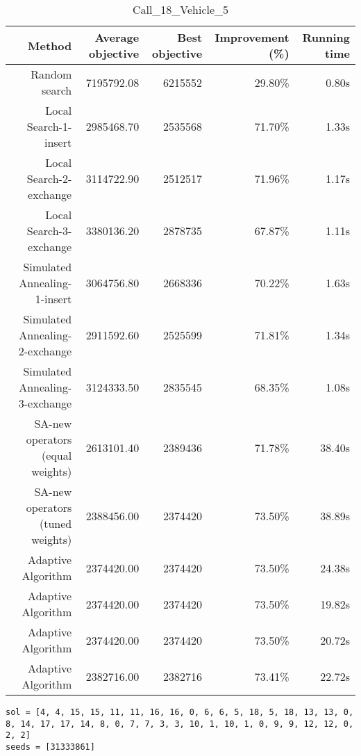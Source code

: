 \begin{table}[ht]
\centering
\caption{Call\_18\_Vehicle\_5}
\label{tab:call18vehicle5}
\begin{tabular}{|r|r|r|r|r|}
Method & Average objective & Best objective & Improvement (\%) & Running time \\
\hline
Random search & 7195792.08 & 6215552 & 29.80\% & 0.80s\\
Local Search-1-insert & 2985468.70 & 2535568 & 71.70\% & 1.33s\\
Local Search-2-exchange & 3114722.90 & 2512517 & 71.96\% & 1.17s\\
Local Search-3-exchange & 3380136.20 & 2878735 & 67.87\% & 1.11s\\
Simulated Annealing-1-insert & 3064756.80 & 2668336 & 70.22\% & 1.63s\\
Simulated Annealing-2-exchange & 2911592.60 & 2525599 & 71.81\% & 1.34s\\
Simulated Annealing-3-exchange & 3124333.50 & 2835545 & 68.35\% & 1.08s\\
SA-new operators (equal weights) & 2613101.40 & 2389436 & 71.78\% & 38.40s\\
SA-new operators (tuned weights) & 2388456.00 & 2374420 & 73.50\% & 38.89s\\
Adaptive Algorithm & 2374420.00 & 2374420 & 73.50\% & 24.38s\\
Adaptive Algorithm & 2374420.00 & 2374420 & 73.50\% & 19.82s\\
Adaptive Algorithm & 2374420.00 & 2374420 & 73.50\% & 20.72s\\
Adaptive Algorithm & 2382716.00 & 2382716 & 73.41\% & 22.72s\\
\end{tabular}%
\end{table}
\begin{lstlisting}[label={lst:call18vehicle5},caption=Optimal solution call\_18\_vehicle\_5]
sol = [4, 4, 15, 15, 11, 11, 16, 16, 0, 6, 6, 5, 18, 5, 18, 13, 13, 0, 8, 14, 17, 17, 14, 8, 0, 7, 7, 3, 3, 10, 1, 10, 1, 0, 9, 9, 12, 12, 0, 2, 2]
seeds = [31333861]
\end{lstlisting}%
\clearpage



